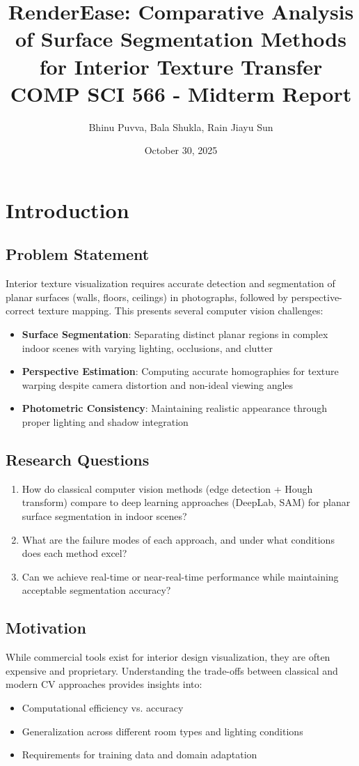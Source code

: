 \documentclass[11pt]{article}
\title{RenderEase: Comparative Analysis of Surface Segmentation Methods for Interior Texture Transfer\\
\large COMP SCI 566 - Midterm Report}
\author{Bhinu Puvva, Bala Shukla, Rain Jiayu Sun}
\date{October 30, 2025}
\begin{document}
\maketitle

\section{Introduction}

\subsection{Problem Statement}
Interior texture visualization requires accurate detection and segmentation of planar surfaces (walls, floors, ceilings) in photographs, followed by perspective-correct texture mapping. This presents several computer vision challenges:

\begin{itemize}
    \item \textbf{Surface Segmentation}: Separating distinct planar regions in complex indoor scenes with varying lighting, occlusions, and clutter
    \item \textbf{Perspective Estimation}: Computing accurate homographies for texture warping despite camera distortion and non-ideal viewing angles
    \item \textbf{Photometric Consistency}: Maintaining realistic appearance through proper lighting and shadow integration
\end{itemize}

\subsection{Research Questions}
\begin{enumerate}
    \item How do classical computer vision methods (edge detection + Hough transform) compare to deep learning approaches (DeepLab, SAM) for planar surface segmentation in indoor scenes?
    \item What are the failure modes of each approach, and under what conditions does each method excel?
    \item Can we achieve real-time or near-real-time performance while maintaining acceptable segmentation accuracy?
\end{enumerate}

\subsection{Motivation}
While commercial tools exist for interior design visualization, they are often expensive and proprietary. Understanding the trade-offs between classical and modern CV approaches provides insights into:
\begin{itemize}
    \item Computational efficiency vs. accuracy
    \item Generalization across different room types and lighting conditions
    \item Requirements for training data and domain adaptation
\end{itemize}
\end{document}
